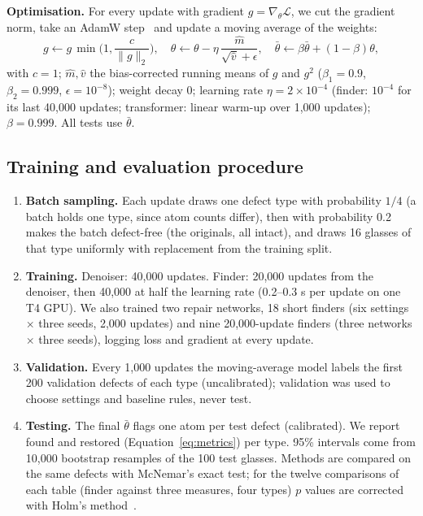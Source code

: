\documentclass[10pt]{article}
\begin{document}
\textbf{Optimisation.} For every update with gradient $g=\nabla_\theta\mathcal L$, we cut the gradient norm, take an AdamW step~\citep{loshchilov2019adamw} and update a moving average of the weights:
\begin{equation}
g\leftarrow g\,\min\!\Big(1,\frac{c}{\lVert g\rVert_2}\Big),\quad
\theta\leftarrow\theta-\eta\,\frac{\hat m}{\sqrt{\hat v}+\epsilon},\quad
\bar\theta\leftarrow\beta\bar\theta+(1-\beta)\theta,
\label{eq:opt}
\end{equation}
with $c=1$; $\hat m,\hat v$ the bias-corrected running means of $g$ and $g^2$ ($\beta_1=0.9$, $\beta_2=0.999$, $\epsilon=10^{-8}$); weight decay 0; learning rate $\eta=2\times10^{-4}$ (finder: $10^{-4}$ for its last 40,000 updates; transformer: linear warm-up over 1,000 updates); $\beta=0.999$. All tests use $\bar\theta$.

\subsection{Training and evaluation procedure}
\label{sec:test}

\begin{enumerate}
\item \textbf{Batch sampling.} Each update draws one defect type with probability $1/4$ (a batch holds one type, since atom counts differ), then with probability 0.2 makes the batch defect-free (the originals, all intact), and draws 16 glasses of that type uniformly with replacement from the training split.
\item \textbf{Training.} Denoiser: 40,000 updates. Finder: 20,000 updates from the denoiser, then 40,000 at half the learning rate (0.2--0.3 s per update on one T4 GPU). We also trained two repair networks, 18 short finders (six settings $\times$ three seeds, 2,000 updates) and nine 20,000-update finders (three networks $\times$ three seeds), logging loss and gradient at every update.
\item \textbf{Validation.} Every 1,000 updates the moving-average model labels the first 200 validation defects of each type (uncalibrated); validation was used to choose settings and baseline rules, never test.
\item \textbf{Testing.} The final $\bar\theta$ flags one atom per test defect (calibrated). We report found and restored (Equation~\ref{eq:metrics}) per type. 95\% intervals come from 10,000 bootstrap resamples of the 100 test glasses. Methods are compared on the same defects with McNemar's exact test; for the twelve comparisons of each table (finder against three measures, four types) $p$ values are corrected with Holm's method~\citep{holm1979}.
\end{enumerate}
\end{document}
